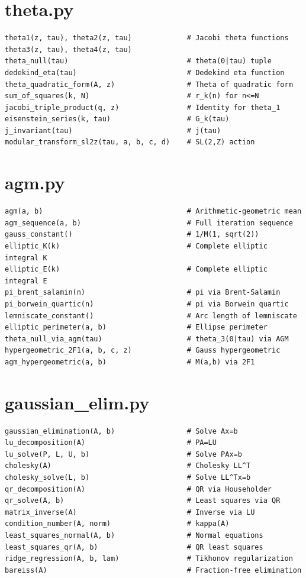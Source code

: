 \section{theta.py}

\begin{lstlisting}[style=python]
theta1(z, tau), theta2(z, tau)             # Jacobi theta functions
theta3(z, tau), theta4(z, tau)
theta_null(tau)                            # theta(0|tau) tuple
dedekind_eta(tau)                          # Dedekind eta function
theta_quadratic_form(A, z)                 # Theta of quadratic form
sum_of_squares(k, N)                       # r_k(n) for n<=N
jacobi_triple_product(q, z)                # Identity for theta_1
eisenstein_series(k, tau)                  # G_k(tau)
j_invariant(tau)                           # j(tau)
modular_transform_sl2z(tau, a, b, c, d)    # SL(2,Z) action
\end{lstlisting}

\section{agm.py}

\begin{lstlisting}[style=python]
agm(a, b)                                  # Arithmetic-geometric mean
agm_sequence(a, b)                         # Full iteration sequence
gauss_constant()                           # 1/M(1, sqrt(2))
elliptic_K(k)                              # Complete elliptic integral K
elliptic_E(k)                              # Complete elliptic integral E
pi_brent_salamin(n)                        # pi via Brent-Salamin
pi_borwein_quartic(n)                      # pi via Borwein quartic
lemniscate_constant()                      # Arc length of lemniscate
elliptic_perimeter(a, b)                   # Ellipse perimeter
theta_null_via_agm(tau)                    # theta_3(0|tau) via AGM
hypergeometric_2F1(a, b, c, z)             # Gauss hypergeometric
agm_hypergeometric(a, b)                   # M(a,b) via 2F1
\end{lstlisting}

\section{gaussian\_elim.py}

\begin{lstlisting}[style=python]
gaussian_elimination(A, b)                 # Solve Ax=b
lu_decomposition(A)                        # PA=LU
lu_solve(P, L, U, b)                       # Solve PAx=b
cholesky(A)                                # Cholesky LL^T
cholesky_solve(L, b)                       # Solve LL^Tx=b
qr_decomposition(A)                        # QR via Householder
qr_solve(A, b)                             # Least squares via QR
matrix_inverse(A)                          # Inverse via LU
condition_number(A, norm)                  # kappa(A)
least_squares_normal(A, b)                 # Normal equations
least_squares_qr(A, b)                     # QR least squares
ridge_regression(A, b, lam)                # Tikhonov regularization
bareiss(A)                                 # Fraction-free elimination
\end{lstlisting}

